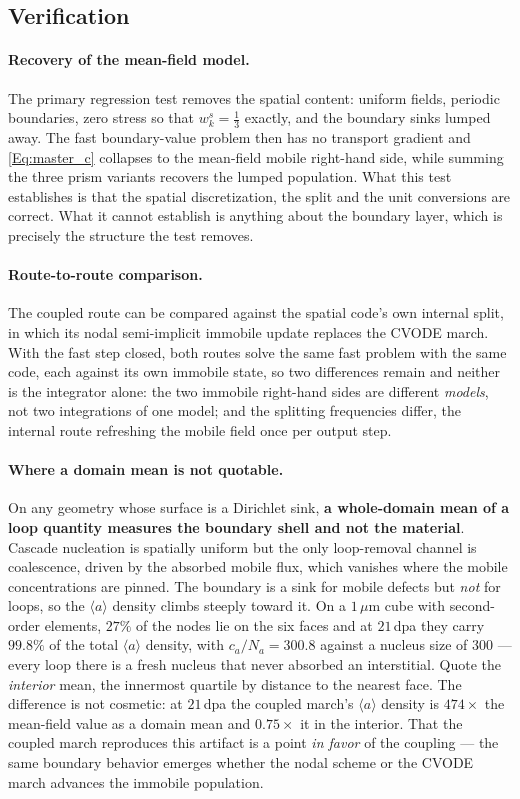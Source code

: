 \documentclass{article}
\newcommand{\aloop}{\ensuremath{\langle a\rangle}}
\begin{document}
\subsection{Verification}
\label{sec:verify}

\paragraph{Recovery of the mean-field model.} The primary regression test removes
the spatial content: uniform fields, periodic boundaries, zero stress so that
$w^s_k=\tfrac13$ exactly, and the boundary sinks lumped away. The fast
boundary-value problem then has no transport gradient and \cref{Eq:master_c}
collapses to the mean-field mobile right-hand side, while summing the three prism
variants recovers the lumped population. What this test establishes is that the
spatial discretization, the split and the unit conversions are correct. What it
cannot establish is anything about the boundary layer, which is precisely the
structure the test removes.

\paragraph{Route-to-route comparison.} The coupled route can be compared against
the spatial code's own internal split, in which its nodal semi-implicit immobile
update replaces the CVODE march. With the fast step closed, both routes solve the
same fast problem with the same code, each against its own immobile state, so two
differences remain and neither is the integrator alone: the two immobile
right-hand sides are different \emph{models}, not two integrations of one model;
and the splitting frequencies differ, the internal route refreshing the mobile
field once per output step.

\paragraph{Where a domain mean is not quotable.} On any geometry whose surface is
a Dirichlet sink, \textbf{a whole-domain mean of a loop quantity measures the
boundary shell and not the material}. Cascade nucleation is spatially uniform but
the only loop-removal channel is coalescence, driven by the absorbed mobile flux,
which vanishes where the mobile concentrations are pinned. The boundary is a sink
for mobile defects but \emph{not} for loops, so the \aloop{} density climbs
steeply toward it. On a $1\,\mu$m cube with second-order elements, $27\%$ of the
nodes lie on the six faces and at $21\,$dpa they carry $99.8\%$ of the total
\aloop{} density, with $c_a/N_a=300.8$ against a nucleus size of $300$ --- every
loop there is a fresh nucleus that never absorbed an interstitial. Quote the
\emph{interior} mean, the innermost quartile by distance to the nearest face. The
difference is not cosmetic: at $21\,$dpa the coupled march's \aloop{} density is
$474\times$ the mean-field value as a domain mean and $0.75\times$ it in the
interior. That the coupled march reproduces this artifact is a point \emph{in
favor} of the coupling --- the same boundary behavior emerges whether the nodal
scheme or the CVODE march advances the immobile population.
\end{document}
